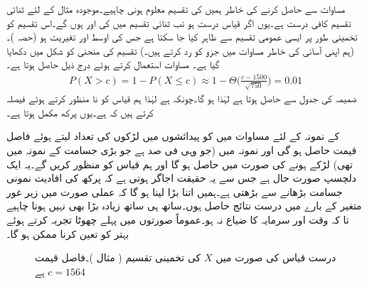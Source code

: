  مساوات  سے  حاصل کرنے کی خاطر ہمیں  کی تقسیم  معلوم ہونی چاہیے۔موجودہ مثال کے لئے ثنائی تقسیم کافی درست ہے۔یوں اگر قیاس درست ہو تب ثنائی تقسیم میں  کی  اور  ہوں گے۔اس تقسیم کو تخمینی طور پر ایسی عمومی تقسیم سے  ظاہر کیا جا سکتا ہے جس کی اوسط  اور تغیریت  ہو (حصہ )۔ (ہم اپنی آسانی کی خاطر مساوات  میں جزو  کو رد کرتے ہیں۔) تقسیم کی منحنی کو شکل  میں دکھایا گیا ہے۔ مساوات  استعمال کرتے ہوئے درج ذیل حاصل ہوتا ہے۔
\begin{align*}
P(X>c)=1-P(X\le c)\approx 1-\Theta\big(\frac{c-1500}{\sqrt{750}}\big)=0.01
\end{align*}
ضمیمہ  کی جدول  سے  حاصل ہوتا ہے  لہٰذا  ہو گا۔چونکہ  ہے لہٰذا ہم قیاس کو نا منظور کرتے ہوئے فیصلہ کرتے ہیں کہ  ہے۔یوں پرکھ مکمل ہوتا ہے۔

 کے نمونہ کے لئے  مساوات  میں  کو  پیدائشوں میں لڑکوں کی تعداد لیتے ہوئے  فاصل قیمت  حاصل ہو گی اور نمونہ میں  (جو وہی فی صد ہے جو  بڑی جسامت کے نمونہ میں تھی)  لڑکے ہونے کی صورت میں  حاصل ہو گا اور ہم قیاس کو منظور کریں گے۔یہ ایک دلچسپ صورت حال ہے جس سے یہ حقیقت اجاگر ہوتی ہے کہ پرکھ کی افادیت نمونی جسامت  بڑھانے سے بڑھتی ہے۔ہمیں  اتنا بڑا لینا ہو گا کہ عملی صورت میں زیر غور متغیر کے بارے میں درست نتائج حاصل ہوں۔ساتھ ہی ساتھ  زیادہ بڑا بھی نہیں ہونا چاہیے تا کہ وقت اور سرمایہ کا ضیاع نہ ہو۔عموماً صورتوں میں پہلے چھوٹا تجربہ کرتے ہوئے بہتر  کو تعین کرنا ممکن ہو گا۔  
\begin{figure}
\centering
{}
\caption{درست قیاس کی صورت میں $X$ کی تخمینی تقسیم ( مثال )۔فاصل قیمت $c=1564$ ہے}
\label{شکل_مثال_شماریات_لڑکا_یا_لڑکی}
\end{figure}

